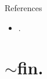 \documentclass[pdf,fyma2]{prosper} %
\begin{document}
\begin{slide}{References}
	\vspace{1em}
	\begin{itemize}
	\item .
	\end{itemize}
\end{slide}

\part{%
\fontsize{14.4pt}{12pt}\selectfont
$\sim$fin.%
}
\end{document}
